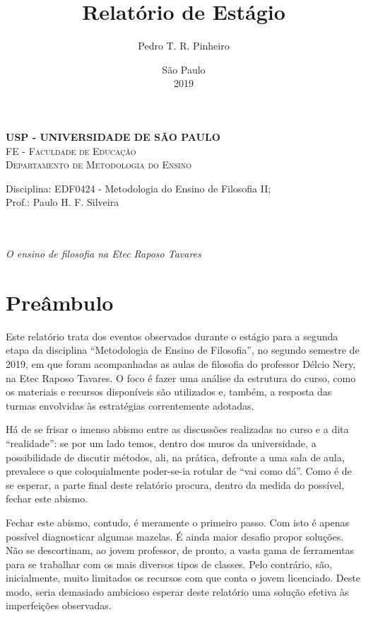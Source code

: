 \documentclass[12pt,a4paper]{article}
\author{Pedro T. R. Pinheiro}
\date{São Paulo\\2019}
\title{Relatório de Estágio}
\newcommand{\subtitulo}{O ensino de filosofia na Etec Raposo Tavares}
\newcommand{\disciplina}{EDF0424 - Metodologia do Ensino de Filosofia II}
\newcommand{\departamento}{Departamento de Metodologia do Ensino}
\newcommand{\unidade}{FE - Faculdade de Educação}
\newcommand{\prof}{Paulo H. F. Silveira}
\begin{document}
	\begin{center}
				\textbf{
				\LARGE USP - UNIVERSIDADE DE SÃO PAULO \\
			}
			\Large \textsc{\unidade} \\
			\large \textsc{\departamento}\\
			\vspace*{1cm}
				
			Disciplina: \disciplina; \\Prof.: \prof
			\vfill
			\begin{center}
				{\Large \textsc{\theauthor}} \\ 
				\vspace{1cm}
				\LARGE\textbf{\thetitle} \\
				\Large\emph{\subtitulo}
			\end{center}
			\vfill
			\large\thedate
			\vspace*{1cm}
			\thispagestyle{empty}			
	\end{center}

	\newpage

	\setlength{\parskip}{0.5cm}
	\setlength{\parindent}{1.1cm}
	\onehalfspacing
	
	\section{Preâmbulo}
	
	Este relatório trata dos eventos observados durante o estágio para a segunda 
	etapa da disciplina ``Metodologia de Ensino de Filosofia'', no segundo 
	semestre de 2019, em que foram acompanhadas as aulas de filosofia do 
	professor Délcio Nery, na Etec Raposo Tavares. O foco é fazer uma análise 
	da estrutura do curso, como os materiais e recursos disponíveis são 
	utilizados e, também, a resposta das turmas envolvidas às estratégias 
	correntemente adotadas. 
	
	Há de se frisar o imenso abismo entre as discussões realizadas no curso 
	e a dita ``realidade'': se por um lado temos, dentro dos muros da 
	universidade, a possibilidade de discutir métodos, ali, na prática, 
	defronte a uma sala de aula, prevalece o que coloquialmente poder-se-ia 
	rotular de ``vai como dá''. Como é de se esperar, a parte final deste 
	relatório procura, dentro da medida do possível, fechar este abismo. 
	
	Fechar este abismo, contudo, é meramente o primeiro passo. Com isto é 
	apenas possível diagnosticar algumas mazelas. É ainda maior desafio 
	propor soluções. Não se descortinam, ao jovem professor, de pronto, 
	a vasta gama de ferramentas para se trabalhar com os mais diversos 
	tipos de classes. Pelo contrário, são, inicialmente, muito limitados 
	os recursos com que conta o jovem licenciado. Deste modo, seria 
	demasiado ambicioso esperar deste relatório uma solução efetiva 
	às imperfeições observadas. 
	
\end{document}
